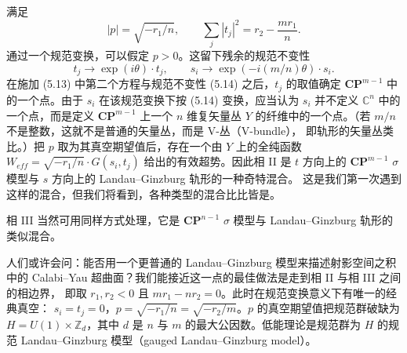 \label{op:54}
满足
\begin{equation}
|p|=\sqrt{-r_1/n},\qquad \sum_j|t_j|^2=r_2-\frac{mr_1}{n}.
\tag{5.13}
\end{equation}
通过一个规范变换，可以假定 $p>0$。这留下残余的规范不变性
\begin{equation}
t_j\to\exp(i\theta)\cdot t_j,\qquad s_i\to\exp(-i(m/n)\theta)\cdot s_i.
\tag{5.14}
\end{equation}
在施加 (5.13) 中第二个方程与规范不变性 (5.14) 之后，$t_j$ 的取值确定
$\mathbf{CP}^{m-1}$ 中的一个点。由于 $s_i$ 在该规范变换下按 (5.14) 变换，应当认为 $s_i$
并不定义 $\mathbb{C}^n$ 中的一个点，而是定义 $\mathbf{CP}^{m-1}$ 上一个 $n$ 维复矢量丛 $Y$
的纤维中的一个点。（若 $m/n$ 不是整数，这就不是普通的矢量丛，而是 V-丛（V-bundle），
即轨形的矢量丛类比。）把 $p$ 取为其真空期望值后，存在一个由 $Y$ 上的全纯函数
$W_{eff}=\sqrt{-r_1/n}\cdot G(s_i,t_j)$ 给出的有效超势。因此相 II 是 $t$ 方向上的
$\mathbf{CP}^{m-1}$ $\sigma$ 模型与 $s$ 方向上的 Landau--Ginzburg 轨形的一种奇特混合。
这是我们第一次遇到这样的混合，但我们将看到，各种类型的混合比比皆是。

相 III 当然可用同样方式处理，它是 $\mathbf{CP}^{n-1}$ $\sigma$ 模型与 Landau--Ginzburg 轨形的
类似混合。

人们或许会问：能否用一个更普通的 Landau--Ginzburg 模型来描述射影空间之积中的
Calabi--Yau 超曲面？我们能接近这一点的最佳做法是走到相 II 与相 III 之间的相边界，
即取 $r_1,r_2<0$ 且 $mr_1-nr_2=0$。此时在规范变换意义下有唯一的经典真空：
$s_i=t_j=0$，$p=\sqrt{-r_1/n}=\sqrt{-r_2/m}$。$p$ 的真空期望值把规范群破缺为
$H=U(1)\times\mathbb{Z}_d$，其中 $d$ 是 $n$ 与 $m$ 的最大公因数。低能理论是规范群为 $H$
的规范 Landau--Ginzburg 模型（gauged Landau--Ginzburg model）。

\label{op:55}

